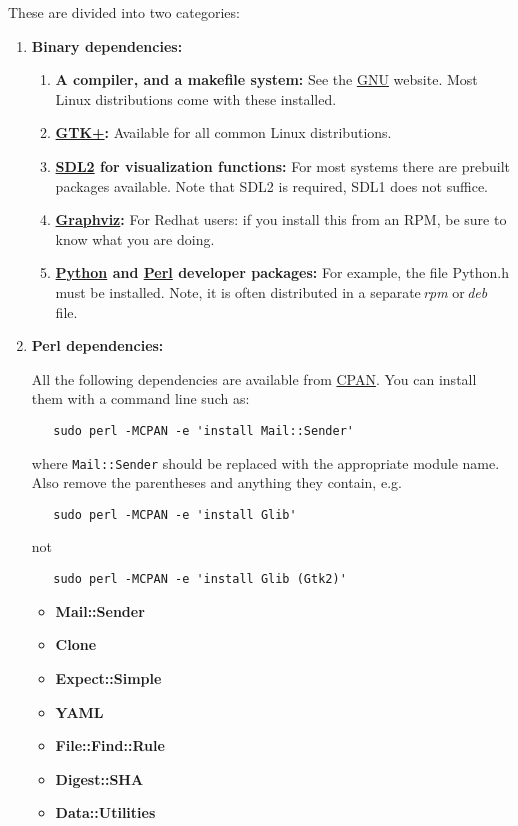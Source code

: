 \documentclass[12pt]{article}
\begin{document}
These are divided into two categories:
\begin{enumerate}
\item {\bf Binary dependencies:}
\begin{enumerate}
\item {\bf A compiler, and a makefile system:} See the \href{http://www.gnu.org/}{GNU} website. Most Linux distributions come with these installed.
\item {\bf \href{http://www.gtk.org/}{GTK+}:} Available for all common Linux distributions.
\item {\bf \href{http://simpledirectorylisting.net/}{SDL2} for visualization functions:} For most systems there are prebuilt packages available. Note that SDL2 is required, SDL1 does not suffice.
\item {\bf \href{www.graphviz.org}{Graphviz}:} For Redhat users: if you install this from an RPM, be sure to know what you are doing.
\item {\bf  \href{http://www.python.org/}{Python} and  \href{http://www.perl.org/}{Perl} developer packages:} For example, the file Python.h must be installed. Note, it is often distributed in a separate\,{\it rpm} or\,{\it deb} file. 
\end{enumerate}

\item {\bf Perl dependencies:}

All the following dependencies are available from \href{http://search.cpan.org/}{CPAN}. You can install them with a command line such as:
\begin{verbatim}
   sudo perl -MCPAN -e 'install Mail::Sender'
\end{verbatim}
where {\tt Mail::Sender} should be replaced with the appropriate module name. Also remove the parentheses and anything they contain, e.g.
\begin{verbatim}
   sudo perl -MCPAN -e 'install Glib'
\end{verbatim}
not
\begin{verbatim}
   sudo perl -MCPAN -e 'install Glib (Gtk2)'
\end{verbatim}

\begin{itemize}
\item {\bf Mail::Sender}
\item {\bf Clone}
\item {\bf Expect::Simple}
\item {\bf YAML}
\item {\bf File::Find::Rule}
\item {\bf Digest::SHA}
\item {\bf Data::Utilities} 
\end{itemize}


\end{enumerate}
\end{document}
